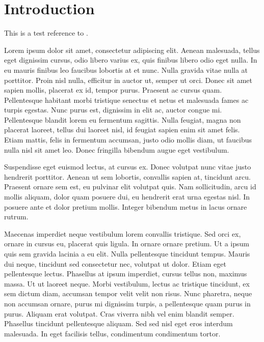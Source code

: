 \chapter{Introduction}
\setcounter{page}{1}


This is a test reference to \autocite{king_anthony_2022}.



Lorem ipsum dolor sit amet, consectetur adipiscing elit. Aenean malesuada, tellus eget dignissim cursus, odio libero varius ex, quis finibus libero odio eget nulla. In eu mauris finibus leo faucibus lobortis at et nunc. Nulla gravida vitae nulla at porttitor. Proin nisl nulla, efficitur in auctor ut, semper ut orci. Donec sit amet sapien mollis, placerat ex id, tempor purus. Praesent ac cursus quam. Pellentesque habitant morbi tristique senectus et netus et malesuada fames ac turpis egestas. Nunc purus est, dignissim in elit ac, auctor congue mi. Pellentesque blandit lorem eu fermentum sagittis. Nulla feugiat, magna non placerat laoreet, tellus dui laoreet nisl, id feugiat sapien enim sit amet felis. Etiam mattis, felis in fermentum accumsan, justo odio mollis diam, ut faucibus nulla nisl sit amet leo. Donec fringilla bibendum augue eget vestibulum.

Suspendisse eget euismod lectus, at cursus ex. Donec volutpat nunc vitae justo hendrerit porttitor. Aenean ut sem lobortis, convallis sapien at, tincidunt arcu. Praesent ornare sem est, eu pulvinar elit volutpat quis. Nam sollicitudin, arcu id mollis aliquam, dolor quam posuere dui, eu hendrerit erat urna egestas nisl. In posuere ante et dolor pretium mollis. Integer bibendum metus in lacus ornare rutrum.

Maecenas imperdiet neque vestibulum lorem convallis tristique. Sed orci ex, ornare in cursus eu, placerat quis ligula. In ornare ornare pretium. Ut a ipsum quis sem gravida lacinia a eu elit. Nulla pellentesque tincidunt tempus. Mauris dui neque, tincidunt sed consectetur nec, volutpat ut dolor. Etiam eget pellentesque lectus. Phasellus at ipsum imperdiet, cursus tellus non, maximus massa. Ut ut laoreet neque. Morbi vestibulum, lectus ac tristique tincidunt, ex sem dictum diam, accumsan tempor velit velit non risus. Nunc pharetra, neque non accumsan ornare, purus mi dignissim turpis, a pellentesque quam purus in purus. Aliquam erat volutpat. Cras viverra nibh vel enim blandit semper. Phasellus tincidunt pellentesque aliquam. Sed sed nisl eget eros interdum malesuada. In eget facilisis tellus, condimentum condimentum tortor.

